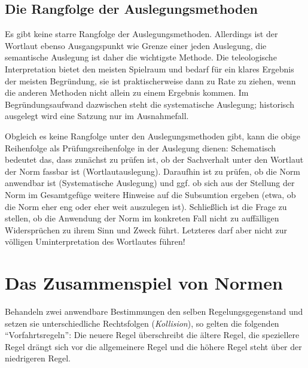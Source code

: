 \subsection{Die Rangfolge der Auslegungsmethoden}
Es gibt keine starre Rangfolge der Auslegungsmethoden. Allerdings ist der Wortlaut ebenso Ausgangspunkt wie Grenze einer jeden Auslegung, die semantische Auslegung ist daher die wichtigste Methode. Die teleologische Interpretation bietet den meisten Spielraum und bedarf für ein klares Ergebnis der meisten Begründung, sie ist praktischerweise dann zu Rate zu ziehen, wenn die anderen Methoden nicht allein zu einem Ergebnis kommen. Im Begründungsaufwand dazwischen steht die systematische Auslegung; historisch ausgelegt wird eine Satzung nur im Ausnahmefall.

Obgleich es keine Rangfolge unter den Auslegungsmethoden gibt, kann die obige Reihenfolge als Prüfungsreihenfolge in der Auslegung dienen: Schematisch bedeutet das, dass zunächst zu prüfen ist, ob der Sachverhalt unter den Wortlaut der Norm fassbar ist (Wortlautauslegung). Daraufhin ist zu prüfen, ob die Norm anwendbar ist (Systematische Auslegung) und ggf. ob sich aus der Stellung der Norm im Gesamtgefüge weitere Hinweise auf die Subsumtion ergeben (etwa, ob die Norm eher eng oder eher weit auszulegen ist). Schließlich ist die Frage zu stellen, ob die Anwendung der Norm im konkreten Fall nicht zu auffälligen Widersprüchen zu ihrem Sinn und Zweck führt. Letzteres darf aber nicht zur völligen Uminterpretation des Wortlautes führen!

\section{Das Zusammenspiel von Normen}
Behandeln zwei anwendbare Bestimmungen den selben Regelungsgegenstand und setzen sie unterschiedliche Rechtsfolgen (\emph{Kollision}), so gelten die folgenden \enquote{Vorfahrtsregeln}: Die neuere Regel überschreibt die ältere Regel, die speziellere Regel drängt sich vor die allgemeinere Regel und die höhere Regel steht über der niedrigeren Regel.

